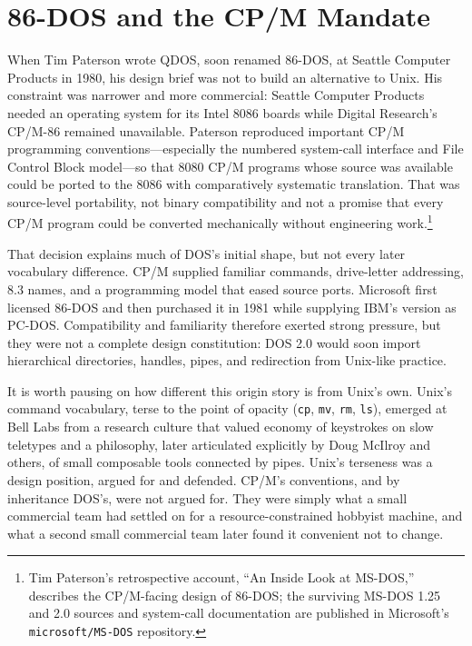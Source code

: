 \documentclass[11pt]{book}
\begin{document}
\section{86-DOS and the CP/M Mandate}

When Tim Paterson wrote QDOS, soon renamed 86-DOS, at Seattle Computer Products in 1980, his design brief was not to build an alternative to Unix. His constraint was narrower and more commercial: Seattle Computer Products needed an operating system for its Intel 8086 boards while Digital Research's CP/M-86 remained unavailable. Paterson reproduced important CP/M programming conventions---especially the numbered system-call interface and File Control Block model---so that 8080 CP/M programs whose source was available could be ported to the 8086 with comparatively systematic translation. That was source-level portability, not binary compatibility and not a promise that every CP/M program could be converted mechanically without engineering work.\footnote{Tim Paterson's retrospective account, ``An Inside Look at MS-DOS,'' describes the CP/M-facing design of 86-DOS; the surviving MS-DOS 1.25 and 2.0 sources and system-call documentation are published in Microsoft's \texttt{microsoft/MS-DOS} repository.}

That decision explains much of DOS's initial shape, but not every later vocabulary difference. CP/M supplied familiar commands, drive-letter addressing, 8.3 names, and a programming model that eased source ports. Microsoft first licensed 86-DOS and then purchased it in 1981 while supplying IBM's version as PC-DOS. Compatibility and familiarity therefore exerted strong pressure, but they were not a complete design constitution: DOS 2.0 would soon import hierarchical directories, handles, pipes, and redirection from Unix-like practice.

It is worth pausing on how different this origin story is from Unix's own. Unix's command vocabulary, terse to the point of opacity (\texttt{cp}, \texttt{mv}, \texttt{rm}, \texttt{ls}), emerged at Bell Labs from a research culture that valued economy of keystrokes on slow teletypes and a philosophy, later articulated explicitly by Doug McIlroy and others, of small composable tools connected by pipes. Unix's terseness was a design position, argued for and defended. CP/M's conventions, and by inheritance DOS's, were not argued for. They were simply what a small commercial team had settled on for a resource-constrained hobbyist machine, and what a second small commercial team later found it convenient not to change.
\end{document}
